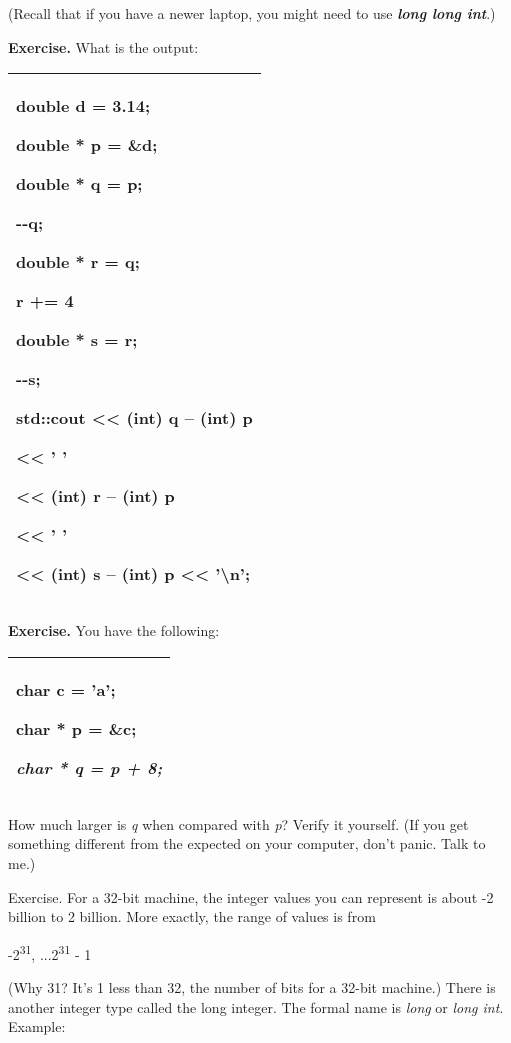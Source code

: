 \documentclass[
]{article}
\begin{document}
(Recall that if you have a newer laptop, you might need to use
\emph{\textbf{long long int}}.)

\textbf{Exercise.} What is the output:

\begin{longtable}[]{@{}l@{}}
\toprule
\endhead
\begin{minipage}[t]{0.97\columnwidth}\raggedright
double d = 3.14;

double * p = \&d;

double * q = p;

-\/-q;

double * r = q;

r += 4

double * s = r;

-\/-s;

std::cout \textless\textless{} (int) q -- (int) p

\textless\textless{} ' '

\textless\textless{} (int) r -- (int) p

\textless\textless{} ' '

\textless\textless{} (int) s -- (int) p \textless\textless{}
'\textbackslash n';\strut
\end{minipage}\tabularnewline
\bottomrule
\end{longtable}

\textbf{Exercise. }You have the following:

\begin{longtable}[]{@{}l@{}}
\toprule
\endhead
\begin{minipage}[t]{0.97\columnwidth}\raggedright
char c = 'a';

char * p = \&c;

\emph{char * q = p + 8;} \strut
\end{minipage}\tabularnewline
\bottomrule
\end{longtable}

How much larger is \emph{q} when compared with \emph{p}? Verify it
yourself. (If you get something different from the expected on your
computer, don't panic. Talk to me.)

Exercise. For a 32-bit machine, the integer values you can represent is
about -2 billion to 2 billion. More exactly, the range of values is from

-2\textsuperscript{31}, ...2\textsuperscript{31} - 1

(Why 31? It's 1 less than 32, the number of bits for a 32-bit machine.)
There is another integer type called the long integer. The formal name
is \emph{long} or \emph{long int}. Example:
\end{document}
